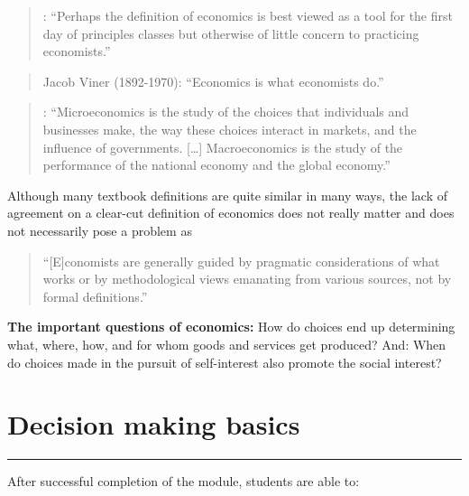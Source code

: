 \documentclass[
  12pt,
  oneside]{book}
\theoremstyle{definition}
\theoremstyle{definition}
\theoremstyle{definition}
\theoremstyle{definition}
\theoremstyle{remark}
\begin{document}
\begin{quote}
\citet[p.~222]{Backhouse2009Retrospectives}: ``Perhaps the definition of economics is best viewed as a tool for the first day of principles classes but otherwise of little concern to practicing economists.''
\end{quote}

\begin{quote}
Jacob Viner (1892-1970): ``Economics is what economists do.'' \citet[p.~222]{Backhouse2009Retrospectives}
\end{quote}

\begin{quote}
\citet[p.~2]{Parkin2012Economics}: ``Microeconomics is the study of the choices that individuals and businesses make, the way these choices interact in markets, and the influence of governments. {[}\ldots{]} Macroeconomics is the study of the performance of the national economy and the global economy.''
\end{quote}

Although many textbook definitions are quite similar in many ways, the
lack of agreement on a clear-cut definition of economics does not really matter and does not necessarily pose a problem as

\begin{quote}
``{[}E{]}conomists are generally guided by pragmatic considerations of what works or by methodological views emanating from various sources, not by formal definitions.'' \citet[p.~231]{Backhouse2009Retrospectives}
\end{quote}

\textbf{The important questions of economics:}
How do choices end up determining what, where, how, and for whom goods and services get produced? And: When do choices made in the pursuit of self-interest also promote the social interest?

\hypertarget{decision-making-basics}{%
\chapter{Decision making basics}\label{decision-making-basics}}

\begin{center}\rule{0.5\linewidth}{0.5pt}\end{center}

After successful completion of the module, students are able to:
\end{document}
